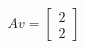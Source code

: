 \documentclass[preview]{standalone}
\begin{document}
\begin{align*}
Av = \begin{bmatrix} 2 \\ 2 \end{bmatrix}
\end{align*}
\end{document}
